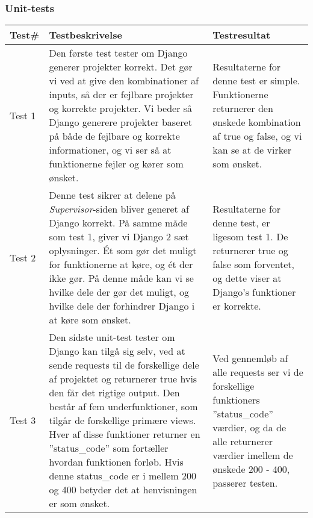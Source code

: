 \documentclass[12pt]{article}
\begin{document}
\subsubsection*{Unit-tests}
\begin{center}
	\begin{tabular}{|p{}|p{}|p{}|}
		\hline
	\textbf{Test\#} & \textbf{Testbeskrivelse} & \textbf{Testresultat} \\ \hline

	Test 1 & Den første test tester om Django generer projekter korrekt. Det gør vi ved at give den kombinationer af inputs, så der er fejlbare projekter og korrekte projekter. Vi beder så Django generere projekter baseret på både de fejlbare og korrekte informationer, og vi ser så at funktionerne fejler og kører som ønsket. & Resultaterne for denne test er simple. Funktionerne returnerer den ønskede kombination af true og false, og vi kan se at de virker som ønsket.  \\ \hline

	Test 2 & Denne test sikrer at delene på \textit{Supervisor}-siden bliver generet af Django korrekt. På samme måde som test 1, giver vi Django 2 sæt oplysninger. Ét som gør det muligt for funktionerne at køre, og ét der ikke gør. På denne måde kan vi se hvilke dele der gør det muligt, og hvilke dele der forhindrer Django i at køre som ønsket. &  Resultaterne for denne test, er ligesom test 1. De returnerer true og false som forventet, og dette viser at Django's funktioner er korrekte. \\ \hline

	Test 3 & Den sidste unit-test tester om Django kan tilgå sig selv, ved at sende requests til de forskellige dele af projektet og returnerer true hvis den får det rigtige output. Den består af fem underfunktioner, som tilgår de forskellige primære views. Hver af disse funktioner returner en ''status\_code'' som fortæller hvordan funktionen forløb. Hvis denne status\_code er i mellem 200 og 400 betyder det at henvisningen er som ønsket. & Ved gennemløb af alle requests ser vi de forskellige funktioners ''status\_code'' værdier, og da de alle returnerer værdier imellem de ønskede 200 - 400, passerer testen. \\ \hline
	\end{tabular}
\end{center}
\end{document}
